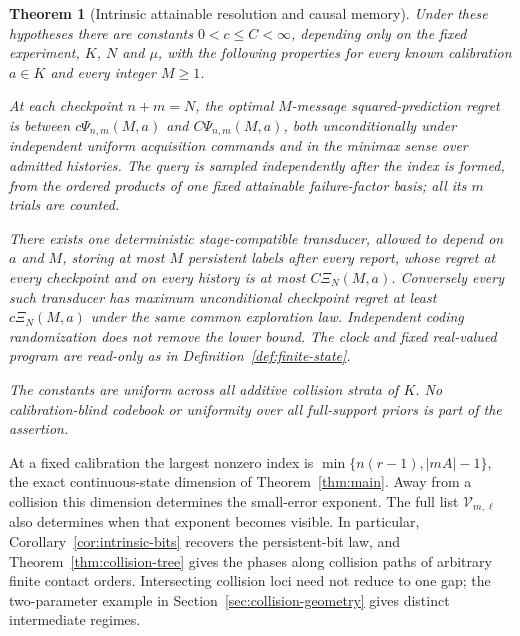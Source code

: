 \documentclass[11pt]{amsart}
\newtheorem{theorem}{Theorem}[section]
\theoremstyle{definition}\newtheorem{definition}[theorem]{Definition}
\theoremstyle{remark}\newtheorem{remark}[theorem]{Remark}
\begin{document}
\begin{theorem}[Intrinsic attainable resolution and causal memory]\label{thm:resolution-main}
Under these hypotheses there are constants $0<c\le C<\infty$,
depending only on the fixed experiment, $K$, $N$ and $\mu$, with the
following properties for every known calibration $a\in K$ and every
integer $M\ge1$.

At each checkpoint $n+m=N$, the optimal $M$-message squared-prediction
regret is between $c\Psi_{n,m}(M,a)$ and $C\Psi_{n,m}(M,a)$,
both unconditionally under independent uniform acquisition commands and
in the minimax sense over admitted histories. The query is sampled
independently after the index is formed, from the ordered products of
one fixed attainable failure-factor basis; all its $m$ trials are counted.

There exists one deterministic stage-compatible transducer, allowed to
depend on $a$ and $M$, storing at most $M$ persistent labels after
every report, whose regret at every checkpoint and on every history is
at most $C\Xi_N(M,a)$. Conversely every such transducer has maximum
unconditional checkpoint regret at least $c\Xi_N(M,a)$ under the
same common exploration law. Independent coding randomization does not
remove the lower bound. The clock and fixed real-valued program are
read-only as in Definition~\ref{def:finite-state}.

The constants are uniform across all additive collision strata of $K$.
No calibration-blind codebook or uniformity over all full-support priors
is part of the assertion.
\end{theorem}


At a fixed calibration the largest nonzero index is
$\min\{n(r-1),|mA|-1\}$, the exact continuous-state dimension of
Theorem~\ref{thm:main}. Away from a collision this dimension determines
the small-error exponent. The full list $\mathcal V_{m,\ell}$ also
determines when that exponent becomes visible. In particular,
Corollary~\ref{cor:intrinsic-bits} recovers the persistent-bit law, and
Theorem~\ref{thm:collision-tree} gives the phases along collision paths
of arbitrary finite contact orders. Intersecting collision loci need
not reduce to one gap; the two-parameter example in
Section~\ref{sec:collision-geometry} gives distinct intermediate regimes.
\end{document}
